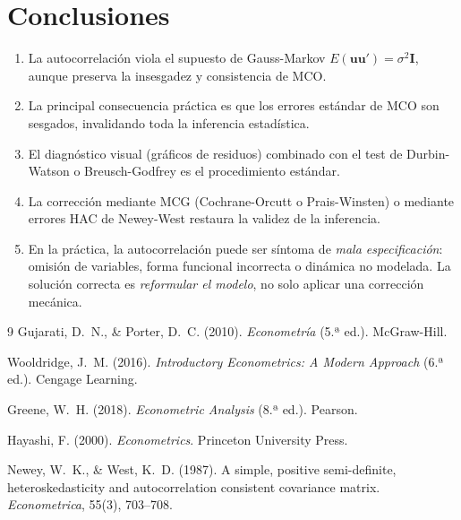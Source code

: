 \documentclass[12pt,a4paper]{article}
\theoremstyle{definition}
\theoremstyle{remark}
\begin{document}
\section{Conclusiones}
\label{sec:conclusiones}

\begin{enumerate}[label=\textbf{\arabic*.}, leftmargin=2em, itemsep=6pt]
  \item La autocorrelación viola el supuesto de Gauss-Markov
        $E(\mathbf{u}\mathbf{u}') = \sigma^2\mathbf{I}$, aunque
        preserva la insesgadez y consistencia de MCO.
  \item La principal consecuencia práctica es que los errores estándar
        de MCO son sesgados, invalidando toda la inferencia estadística.
  \item El diagnóstico visual (gráficos de residuos) combinado con el
        test de Durbin-Watson o Breusch-Godfrey es el procedimiento
        estándar.
  \item La corrección mediante MCG (Cochrane-Orcutt o Prais-Winsten)
        o mediante errores HAC de Newey-West restaura la validez de la
        inferencia.
  \item En la práctica, la autocorrelación puede ser síntoma de
        \emph{mala especificación}: omisión de variables, forma funcional
        incorrecta o dinámica no modelada. La solución correcta es
        \emph{reformular el modelo}, no solo aplicar una corrección mecánica.
\end{enumerate}

\newpage
\begin{thebibliography}{9}
    Gujarati, D.~N., \& Porter, D.~C. (2010).
    \textit{Econometría} (5.ª ed.).
    McGraw-Hill.

    Wooldridge, J.~M. (2016).
    \textit{Introductory Econometrics: A Modern Approach} (6.ª ed.).
    Cengage Learning.

    Greene, W.~H. (2018).
    \textit{Econometric Analysis} (8.ª ed.).
    Pearson.

    Hayashi, F. (2000).
    \textit{Econometrics}.
    Princeton University Press.

    Newey, W.~K., \& West, K.~D. (1987).
    A simple, positive semi-definite, heteroskedasticity and
    autocorrelation consistent covariance matrix.
    \textit{Econometrica}, 55(3), 703--708.
\end{thebibliography}
\end{document}
